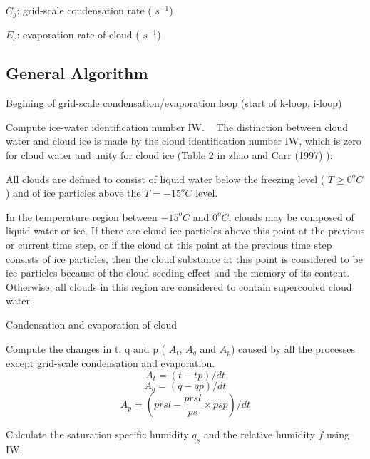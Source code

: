 \begin{DoxyItemize}
\item $C_{g}$\+: grid-\/scale condensation rate ( $s^{-1}$)
\item $E_{c}$\+: evaporation rate of cloud ( $s^{-1}$) 
\end{DoxyItemize}\hypertarget{group__condense_gen_algorithm}{}\subsection{General Algorithm}\label{group__condense_gen_algorithm}

\begin{DoxyEnumerate}
\item Begining of grid-\/scale condensation/evaporation loop (start of k-\/loop, i-\/loop)
\item Compute ice-\/water identification number IW. ~\newline
 The distinction between cloud water and cloud ice is made by the cloud identification number IW, which is zero for cloud water and unity for cloud ice (Table 2 in zhao and Carr (1997) \cite{zhao_and_carr_1997})\+:
\begin{DoxyItemize}
\item All clouds are defined to consist of liquid water below the freezing level ( $T\geq 0^oC$) and of ice particles above the $T=-15^oC$ level.
\item In the temperature region between $-15^oC$ and $0^oC$, clouds may be composed of liquid water or ice. If there are cloud ice particles above this point at the previous or current time step, or if the cloud at this point at the previous time step consists of ice particles, then the cloud substance at this point is considered to be ice particles because of the cloud seeding effect and the memory of its content. Otherwise, all clouds in this region are considered to contain supercooled cloud water.
\end{DoxyItemize}
\item Condensation and evaporation of cloud
\begin{DoxyItemize}
\item Compute the changes in t, q and p ( $A_{t}$, $A_{q}$ and $A_{p}$) caused by all the processes except grid-\/scale condensation and evaporation. \[ A_{t}=(t-tp)/dt \] \[ A_{q}=(q-qp)/dt \] \[ A_{p}=(prsl-\frac{prsl}{ps} \times psp)/dt \]
\item Calculate the saturation specific humidity $q_{s}$ and the relative humidity $f$ using IW.

\end{DoxyItemize}
\end{DoxyEnumerate}
